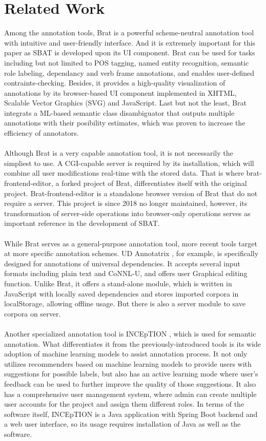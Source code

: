 \documentclass[a4paper]{article}
\begin{document}
\section{Related Work}
Among the annotation tools, Brat \cite{stenetorp-etal-2012-brat} is a powerful scheme-neutral annotation tool with intuitive and user-friendly interface. And it is extremely important for this paper as SBAT is developed upon its UI component. Brat can be used for tasks including but not limited to POS tagging, named entity recognition, semantic role labeling, dependancy and verb frame annotations, and enables user-defined contraints-checking. Besides, it provides a high-quality visualization of annotations by its browser-based UI component implemented in XHTML, Scalable Vector Graphics (SVG) and JavaScript. Last but not the least, Brat integrats a ML-based semantic class disambiguator that outputs multiple annotations with their posibility estimates, which was proven to increase the efficiency of annotators.\\
\\
Although Brat is a very capable annotation tool, it is not necessarily the simpliest to use. A CGI-capable server is required by its installation, which will combine all user modifications real-time with the stored data. That is where brat-frontend-editor, a forked project of Brat, differentiates itself with the original project. Brat-frontend-editor \cite{brat-frontend-editor} is a standalone browser version of Brat that do not require a server. This project is since 2018 no longer maintained, however, its transformation of server-side operations into browser-only operations serves as important reference in the development of SBAT.\\
\\
While Brat serves as a general-purpose annotation tool, more recent tools target at more specific annotation schemes. UD Annotatrix \cite{tyers-etal-2017-ud}, for example, is specifically designed for annotations of universal dependencies. It accepts several input formats including plain text and CoNNL-U, and offers user Graphical editing function. Unlike Brat, it offers a stand-alone module, which is written in JavaScript with locally saved dependencies and stores imported corpora in localStorage, allowing offline usage. But there is also a server module to save corpora on server.\\
\\
Another specialized annotation tool is INCEpTION \cite{klie-etal-2018-inception}, which is used for semantic annotation. What differentiates it from the previously-introduced tools is its wide adoption of machine learning models to assist annotation process. It not only utilizes recommenders based on machine learning models to provide users with suggestions for possible labels, but also has an active learning mode where user's feedback can be used to further improve the quality of those suggestions. It also has a comprehensive user management system, where admin can create multiple user accounts for the project and assign them different roles. In terms of the software itself, INCEpTION is a Java application with Spring Boot backend and a web user interface, so its usage requires installation of Java as well as the software.\\
\end{document}
